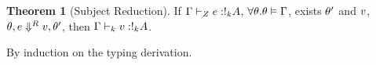 \documentclass[a4paper,11pt]{article}
\theoremstyle{definition}
\newtheorem{thm}{Theorem}
\begin{document}
                            




\begin{thm}[Subject Reduction]
\label{sub-red}
If $\Gamma \vdash_{Z} e : !_{k} A$, $\forall \theta . \theta
\vDash \Gamma$,   exists $\theta'$ and $v$, $\theta , e \mathrel{\Downarrow^{R}} v,
\theta'  $, then $ \Gamma  \vdash_{ k} v :!_{k} A $.  
\end{thm}
By induction on the typing derivation.
\end{document}
